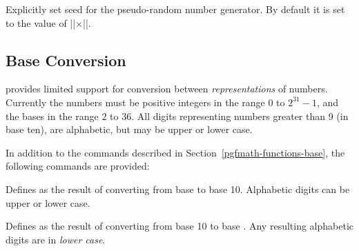 \begin{command}{\pgfmathsetseed{}}
  Explicitly set seed for the pseudo-random number generator. By
  default it is set to the value of |\time|$\times$|\year|.
\end{command}



\subsection{Base Conversion}

\label{pgfmath-bases}

\pgfname{} provides limited support for conversion between
\emph{representations} of numbers. Currently the numbers must be
positive integers in the range $0$ to $2^{31}-1$, and the bases in the
range $2$ to $36$. All digits representing numbers greater than 9 (in
base ten), are alphabetic, but may be upper or lower case.

In addition to the commands described in
Section~\ref{pgfmath-functions-base},
the following commands are provided:

\begin{command}{\pgfmathbasetodec{}}
	Defines  as the result of converting  from
	base  to base 10. Alphabetic digits can be upper or lower
	case.

\medskip

\end{command}

\begin{command}{\pgfmathdectobase{}}
	Defines  as the result of converting  from
	base 10 to base . Any resulting alphabetic digits are in
	\emph{lower case}.

\begin{codeexample}[]
\pgfmathdectobase{} \mynumber
\end{codeexample}

\end{command}

